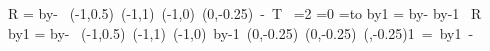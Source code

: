 {{{                         {R\the\op@count@ii}%
            }%
            \op@count@iii=\op@count@i
            \advance\op@count@iii by-%
            \hbox{%
              \kern\op@count@v\opcolumnwidth
              \ifx\op@voperator\op@string@center
                \oplput(-1,0.5){\op@subsymbol}%
              \else\ifx\op@voperator\op@string@top
                \oplput(-1,1){\op@subsymbol}%
              \else
                \oplput(-1,0){\op@subsymbol}%
              \fi\fi
              \ophline(0,-0.25){}%
              \kern-\op@count@v\opcolumnwidth
              \kern\op@count@iii\opcolumnwidth
                         {T\the\op@count@iv}%
            }%
          \else
            \ifnum{}=2
              \ifnum{}=0
                =\hbox to%
              \fi
            \fi
          \fi
          \advance\op@count@ii by1\relax
        \else
          \op@count@v=\op@count@i
          \advance\op@count@v by-%
          \relax\else
            \advance\op@count@v by-1
          \fi
          \hbox{%
            \kern\op@count@v\opcolumnwidth{}
                       {R\the\op@count@ii}%
          }%
          \advance\op@count@ii by1\relax
          \ifx\op@displayintermediary\op@string@none
          \else\ifx\op@displayintermediary\op@string@None
          \else
            \op@count@iii=\op@count@i
            \advance\op@count@iii by-%
            \hbox{%
              \kern\op@count@v\opcolumnwidth
              \ifx\op@voperator\op@string@center
                \oplput(-1,0.5){\op@subsymbol}%
              \else\ifx\op@voperator\op@string@top
                \oplput(-1,1){\op@subsymbol}%
              \else
                \oplput(-1,0){\op@subsymbol}%
              \fi\fi
              \advance\op@count@ii by-1
              \relax
                \ophline(0,-0.25){}%
              \else
                \ophline(0,-0.25){}%
                \ophline(,-0.25){1}%
                {=}%
              \fi
              \advance\op@count@ii by1
              \kern-\op@count@v\opcolumnwidth
}}}
